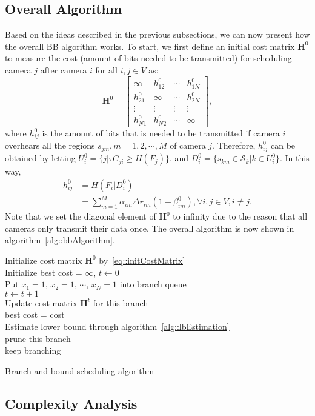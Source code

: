 \subsection{Overall Algorithm}
Based on the ideas described in the previous subsections, we can now present how the overall BB algorithm works.
To start, we first define an initial cost matrix $\mathbf{H}^0$ to measure the cost (amount of bits needed to be transmitted) for scheduling camera $j$ after camera $i$ for all $i,j \in V$ as:
\begin{equation}
\mathbf{H}^0 = \left[ \begin{array}{cccc}
\infty &h_{12}^0 &\cdots &h_{1N}^0 \\
h_{21}^0 &\infty &\cdots &h_{2N}^0 \\
\vdots &\vdots &\vdots &\vdots \\
h_{N1}^0 &h_{N2}^0 &\cdots &\infty
\end{array} \right],
\label{eq::initCostMatrix}
\end{equation}
where $h_{ij}^0$ is the amount of bits that is needed to be transmitted if camera $i$ overhears all the regions ${s_{jm}, m=1,2,\cdots,M}$ of camera $j$.
Therefore, $h_{ij}^0$ can be obtained by letting ${U_i^0=\{ j|\tau C_{ji} \geq H(F_j)\}}$, and $D_i^0 = \{s_{km}\in \mathcal{S}_k | k \in U_i^0\}$.
In this way,
\begin{align}
h_{ij}^0 &= H(F_i|D_i^0) \nonumber \\
         &= \sum_{m=1}^M \alpha_{im}\Delta r_{im} (1-\beta_{im}^0), \forall i,j \in V, i \neq j.
\end{align}
Note that we set the diagonal element of $\mathbf{H}^0$ to infinity due to the reason that all cameras only transmit their data once.
The overall algorithm is now shown in algorithm~\ref{alg::bbAlgorithm}.
\IncMargin{1em}
\begin{algorithm}[]
 \SetAlgoLined
 \BlankLine
 Initialize cost matrix $\mathbf{H}^0$ by~\eqref{eq::initCostMatrix}\\
 Initialize best cost = $\infty$, $t \gets 0$\\
 Put $x_1 = 1$, $x_2 = 1$, $\cdots$, $x_N=1$ into branch queue\\
 {
 	$t \gets t+1$ \\
 	Update cost matrix $\mathbf{H}^t$ for this branch\\
  	{
  			{best cost = cost\\}
 	}
 	{
 		Estimate lower bound through algorithm~\ref{alg::lbEstimation} \\
		{
  			prune this branch\\
 		}
 		{
 			keep branching\\
 		} 	
 	}
 }
 \caption{\label{alg::bbAlgorithm}Branch-and-bound scheduling algorithm}
\end{algorithm}
\DecMargin{1em}
%
\subsection{Complexity Analysis}